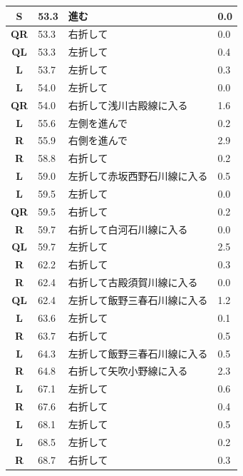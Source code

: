 \documentclass[11pt]{article}
\begin{document}
\begin{center}
\begin{supertabular}{|c|p{0.30in}|p{2.25in}|l|}
 \textbf{S} &  53.3 & 進む &   0.0 \\ \hline
{} \textbf{QR} &  53.3 & 右折して &   0.0 \\ \hline
 \textbf{QL} &  53.3 & 左折して &   0.4 \\ \hline
 \textbf{L} &  53.7 & 左折して &   0.3 \\ \hline
 \textbf{L} &  54.0 & 左折して &   0.0 \\ \hline
{} \textbf{QR} &  54.0 & 右折して浅川古殿線に入る &   1.6 \\ \hline
 \textbf{L} &  55.6 & 左側を進んで &   0.2 \\ \hline
{} \textbf{R} &  55.9 & 右側を進んで &   2.9 \\ \hline
{} \textbf{R} &  58.8 & 右折して &   0.2 \\ \hline
 \textbf{L} &  59.0 & 左折して赤坂西野石川線に入る &   0.5 \\ \hline
 \textbf{L} &  59.5 & 左折して &   0.0 \\ \hline
{} \textbf{QR} &  59.5 & 右折して &   0.2 \\ \hline
{} \textbf{R} &  59.7 & 右折して白河石川線に入る &   0.0 \\ \hline
 \textbf{QL} &  59.7 & 左折して &   2.5 \\ \hline
{} \textbf{R} &  62.2 & 右折して &   0.3 \\ \hline
{} \textbf{R} &  62.4 & 右折して古殿須賀川線に入る &   0.0 \\ \hline
 \textbf{QL} &  62.4 & 左折して飯野三春石川線に入る &   1.2 \\ \hline
 \textbf{L} &  63.6 & 左折して &   0.1 \\ \hline
{} \textbf{R} &  63.7 & 右折して &   0.5 \\ \hline
 \textbf{L} &  64.3 & 左折して飯野三春石川線に入る &   0.5 \\ \hline
{} \textbf{R} &  64.8 & 右折して矢吹小野線に入る &   2.3 \\ \hline
 \textbf{L} &  67.1 & 左折して &   0.6 \\ \hline
{} \textbf{R} &  67.6 & 右折して &   0.4 \\ \hline
 \textbf{L} &  68.1 & 左折して &   0.5 \\ \hline
 \textbf{L} &  68.5 & 左折して &   0.2 \\ \hline
{} \textbf{R} &  68.7 & 右折して &   0.3 \\ \hline

\end{supertabular}
\end{center}
\end{document}
